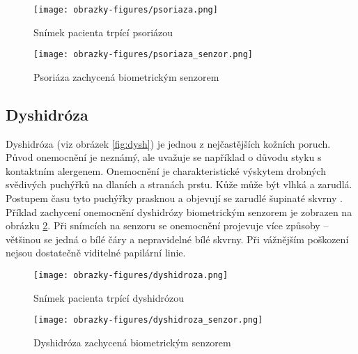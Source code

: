 \begin{figure}[!htbp]
  \begin{minipage}[b]{0.5\linewidth}
    \centering
    \texttt{[image: obrazky-figures/psoriaza.png]}
    \caption{Snímek pacienta trpící psoriázou~\cite{InfluenceSkinDiseases}}
    \label{fig:psoriaza}
  \end{minipage}
  \hspace{0.5cm}
  \begin{minipage}[b]{0.5\linewidth}
    \centering
    \texttt{[image: obrazky-figures/psoriaza\_senzor.png]}
    \caption{Psoriáza zachycená biometrickým senzorem \cite{Barotova}}
    \label{fig:psoriazasensor}
  \end{minipage}
\end{figure}
\subsection{Dyshidróza}
Dyshidróza (viz obrázek \ref{fig:dysh}) je jednou z nejčastějších kožních poruch. Původ onemocnění je neznámý, ale uvažuje se například o důvodu styku s kontaktním alergenem. Onemocnění je charakteristické výskytem drobných svědivých puchýřků na dlaních a stranách prstu. Kůže může být vlhká a zarudlá. Postupem času tyto puchýřky prasknou a objevují se zarudlé šupinaté skvrny \cite{InfluenceSkinDiseases}. Příklad zachycení onemocnění dyshidrózy biometrickým senzorem je zobrazen na obrázku \ref{fig:dyshsensor}. Při snímcích na senzoru se onemocnění projevuje více způsoby -- většinou se jedná o bílé čáry a nepravidelné bílé skvrny. Při vážnějším poškození nejsou dostatečně viditelné papilární linie.

\begin{figure}[!htbp]
  \begin{minipage}[b]{0.5\linewidth}
    \centering
    \texttt{[image: obrazky-figures/dyshidroza.png]}
    \caption{Snímek pacienta trpící dyshidrózou \cite{InfluenceSkinDiseases}}
    \label{fig:dysh}
  \end{minipage}
  \hspace{0.5cm}
  \begin{minipage}[b]{0.5\linewidth}
    \centering
    \texttt{[image: obrazky-figures/dyshidroza\_senzor.png]}
    \caption{Dyshidróza zachycená biometrickým senzorem \cite{Barotova}}
    \label{fig:dyshsensor}
  \end{minipage}
\end{figure}


